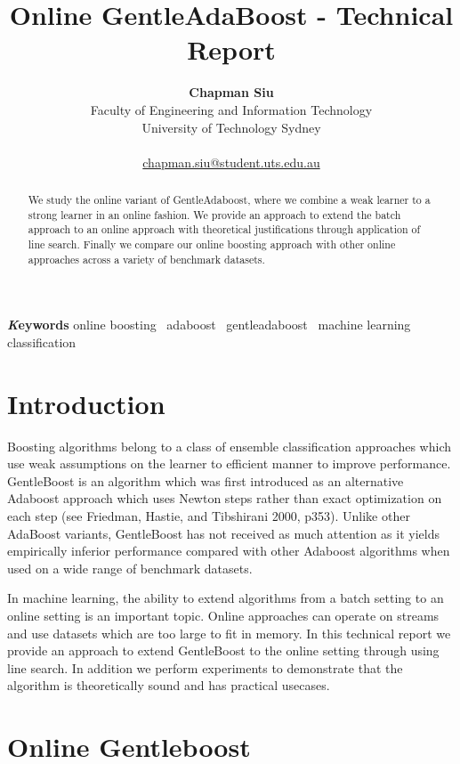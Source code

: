 \documentclass[
]{article}
\title{Online GentleAdaBoost - Technical Report}
\author{
\textbf{Chapman Siu}\\Faculty of Engineering and Information
Technology\\University of Technology
Sydney\\\\\href{mailto:chapman.siu@student.uts.edu.au}{chapman.siu@student.uts.edu.au}}
\date{}
\begin{document}
\maketitle
\begin{abstract}
We study the online variant of GentleAdaboost, where we combine a weak
learner to a strong learner in an online fashion. We provide an approach
to extend the batch approach to an online approach with theoretical
justifications through application of line search. Finally we compare
our online boosting approach with other online approaches across a
variety of benchmark datasets.
\end{abstract}
{\bfseries \emph Keywords}
\def\sep{\textbullet\ }
online boosting \sep adaboost \sep gentleadaboost \sep machine
learning \sep 
classification

\ifdefined\Shaded\renewenvironment{Shaded}{\begin{tcolorbox}[boxrule=0pt, frame hidden, enhanced, breakable, sharp corners, interior hidden, borderline west={3pt}{0pt}{shadecolor}]}{\end{tcolorbox}}\fi

\hypertarget{sec-intro}{%
\section{Introduction}\label{sec-intro}}

Boosting algorithms belong to a class of ensemble classification
approaches which use weak assumptions on the learner to efficient manner
to improve performance. GentleBoost is an algorithm which was first
introduced as an alternative Adaboost approach which uses Newton steps
rather than exact optimization on each step (see Friedman, Hastie, and
Tibshirani 2000, p353). Unlike other AdaBoost variants, GentleBoost has
not received as much attention as it yields empirically inferior
performance compared with other Adaboost algorithms when used on a wide
range of benchmark datasets.

In machine learning, the ability to extend algorithms from a batch
setting to an online setting is an important topic. Online approaches
can operate on streams and use datasets which are too large to fit in
memory. In this technical report we provide an approach to extend
GentleBoost to the online setting through using line search. In addition
we perform experiments to demonstrate that the algorithm is
theoretically sound and has practical usecases.

\hypertarget{online-gentleboost}{%
\section{Online Gentleboost}\label{online-gentleboost}}
\end{document}
